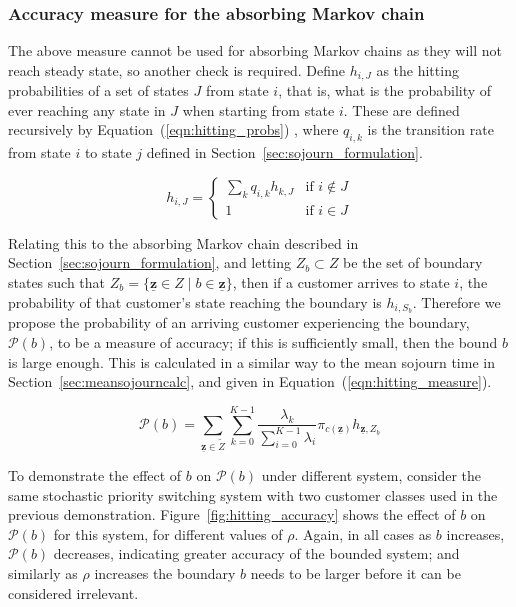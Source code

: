 \documentclass{article}
\begin{document}
\subsubsection{Accuracy measure for the absorbing Markov chain}\label{sec:absorbing_accuracy}
The above measure cannot be used for absorbing Markov chains as they will not
reach steady state, so another check is required.
Define $h_{i,J}$ as the hitting probabilities of a set of states $J$ from state
$i$, that is, what is the probability of ever reaching any state in $J$ when
starting from state $i$.
These are defined recursively by Equation~(\ref{eqn:hitting_probs})
\cite{privault13}, where $q_{i,k}$ is the transition rate from state $i$ to
state $j$ defined in Section~\ref{sec:sojourn_formulation}.

\begin{equation}\label{eqn:hitting_probs}
h_{i,J} = \begin{cases}
\sum_k q_{i,k} h_{k,J} & \text{if } i \notin J \\
1 & \text{if } i \in J
\end{cases}
\end{equation}

Relating this to the absorbing Markov chain described in
Section~\ref{sec:sojourn_formulation}, and letting $Z_b \subset Z$ be the set of
boundary states such that
$Z_b = \{\underline{\mathbf{z}} \in Z \; | \; b \in \underline{\mathbf{z}}\}$,
then if a customer arrives to state $i$, the probability of that customer's
state reaching the boundary is $h_{i,S_b}$.
Therefore we propose the probability of an arriving customer experiencing the
boundary, $\mathcal{P}(b)$, to be a measure of accuracy; if this is sufficiently
small, then the bound $b$ is large enough.
This is calculated in a similar way to the mean sojourn time in
Section~\ref{sec:meansojourncalc}, and given in
Equation~(\ref{eqn:hitting_measure}).

\begin{equation}\label{eqn:hitting_measure}
\mathcal{P}(b) = \sum_{\underline{\mathbf{z}} \in \tilde{Z}} \sum_{k=0}^{K-1} \frac{\lambda_k}{\sum_{i=0}^{K-1} \lambda_i} \pi_{c(\underline{\mathbf{z}})} h_{\underline{\mathbf{z}}, Z_b}
\end{equation}

To demonstrate the effect of $b$ on $\mathcal{P}(b)$ under different system,
consider the same stochastic priority switching system with two customer classes
used in the previous demonstration.
Figure~\ref{fig:hitting_accuracy} shows the effect of $b$ on $\mathcal{P}(b)$
for this system, for different values of $\rho$.
Again, in all cases as $b$ increases, $\mathcal{P}(b)$ decreases, indicating
greater accuracy of the bounded system; and similarly as $\rho$ increases the
boundary $b$ needs to be larger before it can be considered irrelevant.
\end{document}
